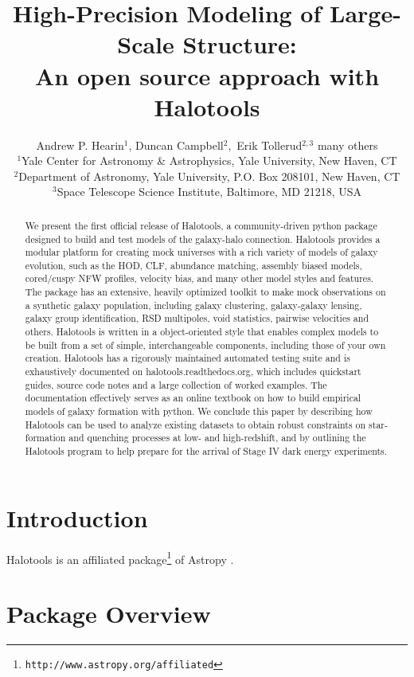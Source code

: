 \documentclass[usenatbib,usegraphicx,letterpaper]{mn2e}
\title[Halotools]
{
High-Precision Modeling of Large-Scale Structure: \\An open source approach with Halotools}
\author[Hearin et al.]
{Andrew P. Hearin$^{1}$, Duncan Campbell$^{2},$ Erik Tollerud$^{2,3}$\newauthor
many others \\
$^1$Yale Center for Astronomy \& Astrophysics, Yale University, New Haven, CT\\
$^2$Department of Astronomy, Yale University, P.O. Box 208101, New Haven, CT\\
$^3$Space Telescope Science Institute, Baltimore, MD 21218, USA}
\begin{document}
\maketitle

\begin{abstract}

We  present the first official release of Halotools, a community-driven python package designed to build and test models of the galaxy-halo connection. Halotools provides a modular platform for creating mock universes with a rich variety of models of galaxy evolution, such as the HOD, CLF, abundance matching, assembly biased models, cored/cuspy NFW profiles, velocity bias, and many other model styles and features. The package has an extensive, heavily optimized toolkit to make mock observations on a synthetic galaxy population, including galaxy clustering, galaxy-galaxy lensing, galaxy group identification, RSD multipoles, void statistics, pairwise velocities and others. Halotools is written in a object-oriented style that enables complex models to be built from a set of simple, interchangeable components, including those of your own creation. Halotools has a rigorously maintained automated testing suite and is exhaustively documented on halotools.readthedocs.org, which includes quickstart guides, source code notes and a large collection of worked examples. The documentation effectively serves as an online textbook on how to build empirical models of galaxy formation with python. We conclude this paper by describing how Halotools can be used to analyze existing datasets to obtain robust constraints on star-formation and quenching processes at low- and high-redshift, and by outlining the Halotools program to help prepare for the arrival of Stage IV dark energy experiments.

\end{abstract} 

\section{Introduction}
\label{section:introduction}

Halotools is an affiliated package\footnote{\tt http://www.astropy.org/affiliated} of Astropy \citep{astropy}.

\section{Package Overview}
\label{section:overview}
\end{document}
